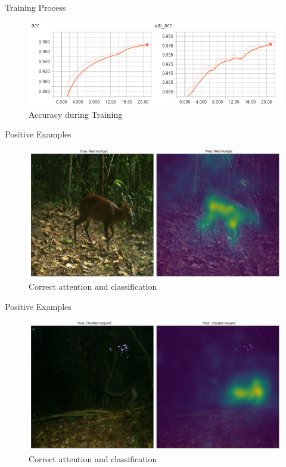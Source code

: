 \documentclass[10pt]{beamer}
\begin{document}

\begin{frame}{Training Process}
	\centering
	\begin{figure}
		\includegraphics[width=.9\columnwidth,height=\textheight,keepaspectratio]{images/acc.png}
		\caption{Accuracy during Training}
	\end{figure}
\end{frame}


\begin{frame}{Positive Examples}
	\centering
	\begin{figure}
		\includegraphics[width=\columnwidth]{images/Attention_right6.png}
		\caption{Correct attention and classification}
	\end{figure}
\end{frame}


\begin{frame}{Positive Examples}
	\centering
	\begin{figure}
		\includegraphics[width=\columnwidth]{images/Attention_right5.png}
		\caption{Correct attention and classification}
	\end{figure}
\end{frame}
\end{document}

